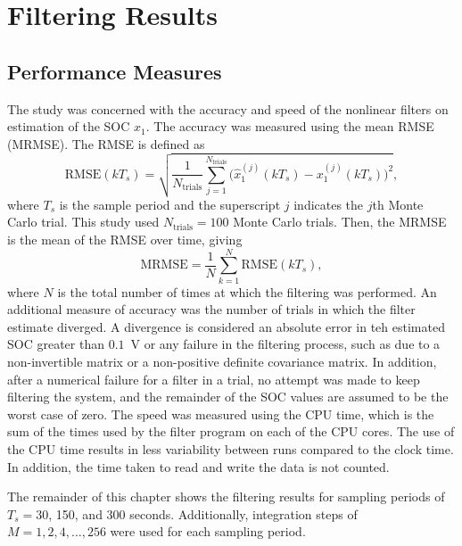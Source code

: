 \documentclass[../zhang_thesis.tex]{subfiles}
\begin{document}
\chapter{Filtering Results}


\section{Performance Measures}

The study was concerned with the accuracy and speed of the nonlinear filters on estimation of the SOC $x_1$. The accuracy was measured using the mean RMSE (MRMSE). The RMSE is defined as
\begin{equation}
    \mathrm{RMSE}(kT_s) = \sqrt{ \frac{1}{N_\text{trials}} \sum_{j=1}^{N_\text{trials}} \Big( \hat{x}_1^{(j)}(kT_s) - x_1^{(j)}(kT_s) \Big)^2 },
\end{equation}
where $T_s$ is the sample period and the superscript $j$ indicates the $j$th Monte Carlo trial. This study used $N_\text{trials}=100$ Monte Carlo trials. Then, the MRMSE is the mean of the RMSE over time, giving
\begin{equation}
    \mathrm{MRMSE} = \frac{1}{N} \sum_{k=1}^N \mathrm{RMSE}(kT_s),
\end{equation}
where $N$ is the total number of times at which the filtering was performed. An additional measure of accuracy was the number of trials in which the filter estimate diverged. A divergence is considered an absolute error in teh estimated SOC greater than $0.1$~V or any failure in the filtering process, such as due to a non-invertible matrix or a non-positive definite covariance matrix. In addition, after a numerical failure for a filter in a trial, no attempt was made to keep filtering the
system, and the remainder of the SOC values are assumed to be the worst case of zero. The speed was measured using the CPU time, which is the sum of the times used by the filter program on each of the CPU cores. The use of the CPU time results in less variability between runs compared to the clock time. In addition, the time taken to read and write the data is not counted.

The remainder of this chapter shows the filtering results for sampling periods of $T_s=30$, 150, and 300 seconds. Additionally, integration steps of $M=1,2,4,\dots,256$ were used for each sampling period.

\clearpage
\end{document}
